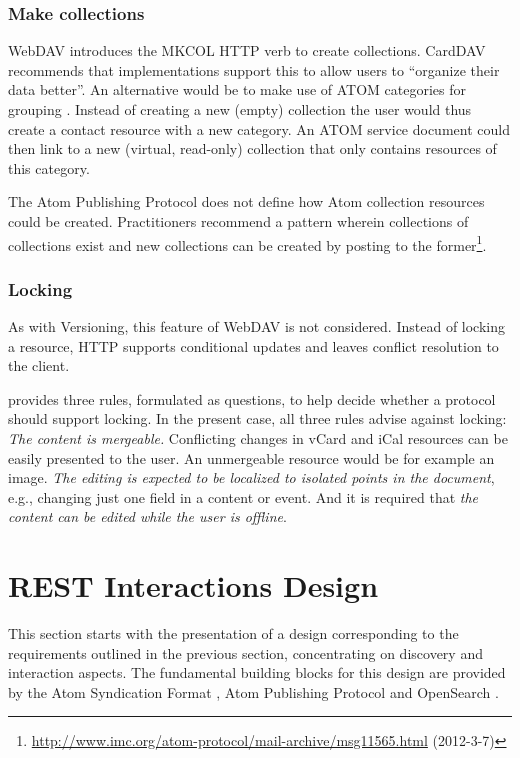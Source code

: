 \documentclass[11pt,a4paper,headsepline,twoside]{scrartcl}		%
\newcommand{\citeurl}[2]{\url{#1} (#2)}
\begin{document}
\subsubsection{Make collections}

WebDAV introduces the MKCOL HTTP verb to create collections. CardDAV recommends
that implementations support this to allow users to ``organize their data
better''. An alternative would be to make use of ATOM categories for
grouping \cite{RFC5023}. Instead of creating a new (empty) collection the user
would thus create a contact resource with a new category. An ATOM service
document could then link to a new (virtual, read-only) collection that only
contains resources of this category.

The Atom Publishing Protocol does not define how Atom collection resources could
be created. Practitioners recommend a pattern wherein collections of collections
exist and new collections can be created by posting to the
former\footnote{\citeurl{http://www.imc.org/atom-protocol/mail-archive/msg11565.html}{2012-3-7}}.

\subsubsection{Locking}
\label{sec:locking}

As with Versioning, this feature of WebDAV is not considered. Instead of locking
a resource, HTTP supports conditional updates and leaves conflict resolution to
the client.

\cite[sec. 1]{Nielsen1999} provides three rules, formulated as questions, to
help decide whether a protocol should support locking. In the present case,
all three rules advise against locking: \textit{The content is mergeable.}
Conflicting changes in vCard and iCal resources can be easily presented to the
user. An unmergeable resource would be for example an image. \textit{The editing
  is expected to be localized to isolated points in the document}, e.g.,
changing just one field in a content or event. And it is required that
\textit{the content can be edited while the user is offline}.

\section{REST Interactions Design}
\label{sec:interactions}

This section starts with the presentation of a design corresponding to the
requirements outlined in the previous section, concentrating on discovery and
interaction aspects. The fundamental building blocks for this design are
provided by the Atom Syndication Format \cite{RFC4287}, Atom Publishing Protocol
\cite{RFC5023} and OpenSearch \cite{Clinton}.
\end{document}
